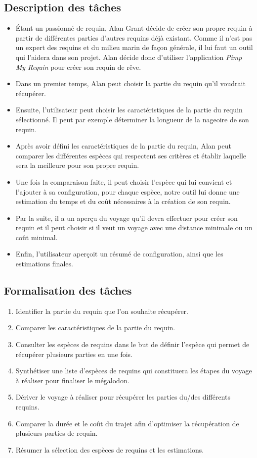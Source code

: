 \documentclass{article}
\begin{document}
\subsection{Description des tâches}
\begin{itemize}
	\item Étant un passionné de requin, Alan Grant décide de créer son propre requin à partir de différentes parties d'autres requins déjà existant. Comme il n'est pas un expert des requins et du milieu marin de façon générale, il lui faut un outil qui l'aidera dans son projet. Alan décide donc d'utiliser l'application \textit{Pimp My Requin} pour créer son requin de rêve.
	\item Dans un premier temps, Alan peut choisir la partie du requin qu'il voudrait récupérer.
	\item Ensuite, l'utilisateur peut choisir les caractéristiques de la partie du requin sélectionné. Il peut par exemple déterminer la longueur de la nageoire de son requin.
	\item Après avoir défini les caractéristiques de la partie du requin, Alan peut comparer les différentes espèces qui respectent ses critères et établir laquelle sera la meilleure pour son propre requin.
	\item Une fois la comparaison faite, il peut choisir l'espèce qui lui convient et l'ajouter à sa configuration, pour chaque espèce, notre outil lui donne une estimation du temps et du coût nécessaires à la création de son requin.
	\item Par la suite, il a un aperçu du voyage qu'il devra effectuer pour créer son requin et il peut choisir si il veut un voyage avec une distance minimale ou un coût minimal.
	\item Enfin, l'utilisateur aperçoit un résumé de configuration, ainsi que les estimations finales.
\end{itemize}

\subsection{Formalisation des tâches}
\begin{enumerate}
	\item Identifier la partie du requin que l’on souhaite récupérer.
	\item Comparer les caractéristiques de la partie du requin.
	\item Consulter les espèces de requins dans le but de définir l’espèce qui permet de récupérer plusieurs parties en une fois.
	\item Synthétiser une liste d’espèces de requins qui constituera les étapes du voyage à réaliser pour finaliser le mégalodon.
	\item Dériver le voyage à réaliser pour récupérer les parties du/des différents requins.
	\item Comparer la durée et le coût du trajet afin d’optimiser la récupération de plusieurs parties de requin.
	\item Résumer la sélection des espèces de requins et les estimations.
\end{enumerate}
\end{document}
